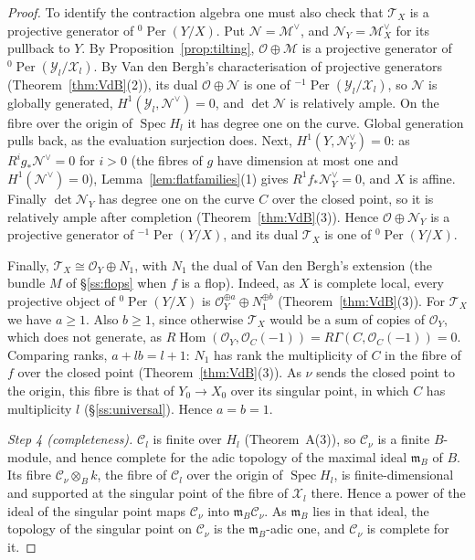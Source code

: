 \documentclass[11pt]{amsart}
\numberwithin{table}{section}
\numberwithin{figure}{section}
\numberwithin{equation}{section}
\theoremstyle{definition}
\theoremstyle{plain}
\newcommand{\cC}{\mathcal{C}}
\newcommand{\cO}{\mathcal{O}}
\newcommand{\cX}{\mathcal{X}}
\newcommand{\cY}{\mathcal{Y}}
\DeclareMathOperator{\Spec}{Spec}
\DeclareMathOperator{\Hom}{Hom}
\DeclareMathOperator{\Per}{Per}
\begin{document}
\begin{proof}
To identify the contraction algebra one must also check that $\mathcal T_X$ is a projective generator of ${}^0\Per(Y/X)$. Put $\mathcal N = \mathcal M^\vee$, and $\mathcal N_Y = \mathcal M_X^\vee$ for its pullback to $Y$. By Proposition~\ref{prop:tilting}, $\cO \oplus \mathcal M$ is a projective generator of ${}^{0}\Per(\cY_l/\cX_l)$. By Van den Bergh's characterisation of projective generators (Theorem~\ref{thm:VdB}(2)), its dual $\cO \oplus \mathcal N$ is one of ${}^{-1}\Per(\cY_l/\cX_l)$, so $\mathcal N$ is globally generated, $H^1(\cY_l, \mathcal N^\vee) = 0$, and $\det \mathcal N$ is relatively ample. On the fibre over the origin of $\Spec H_l$ it has degree one on the curve. Global generation pulls back, as the evaluation surjection does. Next, $H^1(Y, \mathcal N_Y^\vee) = 0$: as $R^ig_*\mathcal N^\vee = 0$ for $i > 0$ (the fibres of $g$ have dimension at most one and $H^1(\mathcal N^\vee) = 0$), Lemma~\ref{lem:flatfamilies}(1) gives $R^1f_*\mathcal N_Y^\vee = 0$, and $X$ is affine. Finally $\det \mathcal N_Y$ has degree one on the curve $C$ over the closed point, so it is relatively ample after completion (Theorem~\ref{thm:VdB}(3)). Hence $\cO \oplus \mathcal N_Y$ is a projective generator of ${}^{-1}\Per(Y/X)$, and its dual $\mathcal T_X$ is one of ${}^{0}\Per(Y/X)$.

Finally, $\mathcal T_X \cong \cO_Y \oplus N_1$, with $N_1$ the dual of Van den Bergh's extension (the bundle $M$ of \S\ref{ss:flops} when $f$ is a flop). Indeed, as $X$ is complete local, every projective object of ${}^0\Per(Y/X)$ is $\cO_Y^{\oplus a} \oplus N_1^{\oplus b}$ (Theorem~\ref{thm:VdB}(3)). For $\mathcal T_X$ we have $a \ge 1$. Also $b \ge 1$, since otherwise $\mathcal T_X$ would be a sum of copies of $\cO_Y$, which does not generate, as $R\Hom(\cO_Y, \cO_C(-1)) = R\Gamma(C, \cO_C(-1)) = 0$. Comparing ranks, $a + lb = l + 1$: $N_1$ has rank the multiplicity of $C$ in the fibre of $f$ over the closed point (Theorem~\ref{thm:VdB}(3)). As $\nu$ sends the closed point to the origin, this fibre is that of $Y_0 \to X_0$ over its singular point, in which $C$ has multiplicity $l$ (\S\ref{ss:universal}). Hence $a = b = 1$.

\emph{Step 4 (completeness).} $\cC_l$ is finite over $H_l$ (Theorem~A(3)), so $\cC_\nu$ is a finite $B$-module, and hence complete for the adic topology of the maximal ideal $\mathfrak m_B$ of $B$. Its fibre $\cC_\nu \otimes_B k$, the fibre of $\cC_l$ over the origin of $\Spec H_l$, is finite-dimensional and supported at the singular point of the fibre of $\cX_l$ there. Hence a power of the ideal of the singular point maps $\cC_\nu$ into $\mathfrak m_B\cC_\nu$. As $\mathfrak m_B$ lies in that ideal, the topology of the singular point on $\cC_\nu$ is the $\mathfrak m_B$-adic one, and $\cC_\nu$ is complete for it.


\end{proof}
\end{document}
